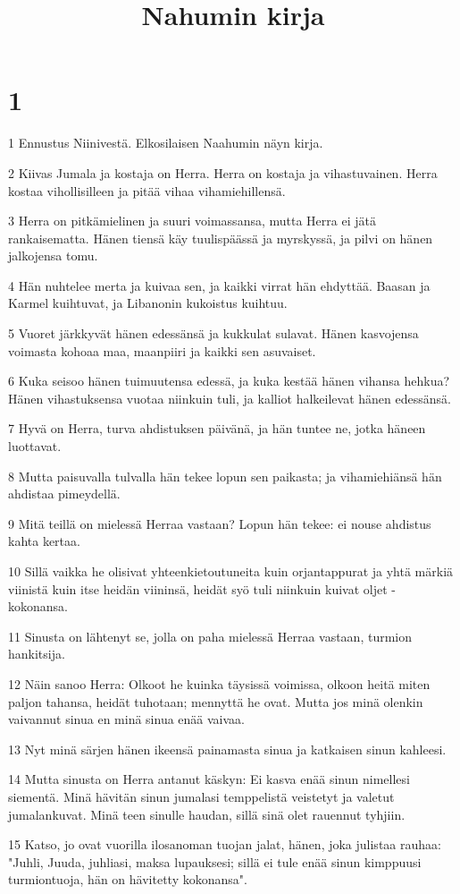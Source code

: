

\title{Nahumin kirja}


\chapter{1}

\par 1 Ennustus Niinivestä. Elkosilaisen Naahumin näyn kirja.
\par 2 Kiivas Jumala ja kostaja on Herra. Herra on kostaja ja vihastuvainen. Herra kostaa vihollisilleen ja pitää vihaa vihamiehillensä.
\par 3 Herra on pitkämielinen ja suuri voimassansa, mutta Herra ei jätä rankaisematta. Hänen tiensä käy tuulispäässä ja myrskyssä, ja pilvi on hänen jalkojensa tomu.
\par 4 Hän nuhtelee merta ja kuivaa sen, ja kaikki virrat hän ehdyttää. Baasan ja Karmel kuihtuvat, ja Libanonin kukoistus kuihtuu.
\par 5 Vuoret järkkyvät hänen edessänsä ja kukkulat sulavat. Hänen kasvojensa voimasta kohoaa maa, maanpiiri ja kaikki sen asuvaiset.
\par 6 Kuka seisoo hänen tuimuutensa edessä, ja kuka kestää hänen vihansa hehkua? Hänen vihastuksensa vuotaa niinkuin tuli, ja kalliot halkeilevat hänen edessänsä.
\par 7 Hyvä on Herra, turva ahdistuksen päivänä, ja hän tuntee ne, jotka häneen luottavat.
\par 8 Mutta paisuvalla tulvalla hän tekee lopun sen paikasta; ja vihamiehiänsä hän ahdistaa pimeydellä.
\par 9 Mitä teillä on mielessä Herraa vastaan? Lopun hän tekee: ei nouse ahdistus kahta kertaa.
\par 10 Sillä vaikka he olisivat yhteenkietoutuneita kuin orjantappurat ja yhtä märkiä viinistä kuin itse heidän viininsä, heidät syö tuli niinkuin kuivat oljet - kokonansa.
\par 11 Sinusta on lähtenyt se, jolla on paha mielessä Herraa vastaan, turmion hankitsija.
\par 12 Näin sanoo Herra: Olkoot he kuinka täysissä voimissa, olkoon heitä miten paljon tahansa, heidät tuhotaan; mennyttä he ovat. Mutta jos minä olenkin vaivannut sinua en minä sinua enää vaivaa.
\par 13 Nyt minä särjen hänen ikeensä painamasta sinua ja katkaisen sinun kahleesi.
\par 14 Mutta sinusta on Herra antanut käskyn: Ei kasva enää sinun nimellesi siementä. Minä hävitän sinun jumalasi temppelistä veistetyt ja valetut jumalankuvat. Minä teen sinulle haudan, sillä sinä olet rauennut tyhjiin.
\par 15 Katso, jo ovat vuorilla ilosanoman tuojan jalat, hänen, joka julistaa rauhaa: "Juhli, Juuda, juhliasi, maksa lupauksesi; sillä ei tule enää sinun kimppuusi turmiontuoja, hän on hävitetty kokonansa".


